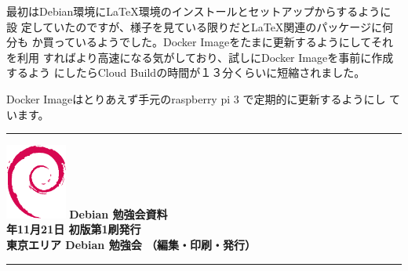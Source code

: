 \documentclass[mingoth,a4paper]{jsarticle}
\newcommand{\debmtgyear}{2020}
\newcommand{\debmtgmonth}{11}
\newcommand{\debmtgdate}{21}
\begin{document}
最初はDebian環境にLaTeX環境のインストールとセットアップからするように設
定していたのですが、様子を見ている限りだとLaTeX関連のパッケージに何分も
か買っているようでした。Docker Imageをたまに更新するようにしてそれを利用
すればより高速になる気がしており、試しにDocker Imageを事前に作成するよう
にしたらCloud Buildの時間が１３分くらいに短縮されました。

Docker Imageはとりあえず手元のraspberry pi 3 で定期的に更新するようにし
ています。

\mbox{}\newpage
\mbox{}\newpage
\mbox{}\newpage

\vspace*{15cm}
\hrule
\vspace{2mm}
\includegraphics[width=2cm]{image200502/openlogo-nd.eps}
\noindent \Large \bf Debian 勉強会資料\\
\noindent \normalfont \debmtgyear{}年\debmtgmonth{}月\debmtgdate{}日 \hspace{5mm}  初版第1刷発行\\
\noindent \normalfont 東京エリア Debian 勉強会 （編集・印刷・発行）\\
\hrule
\end{document}

